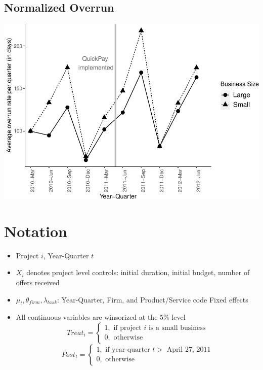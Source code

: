 \documentclass[
]{article}
\providecommand{\tightlist}{%
  \setlength{\itemsep}{0pt}\setlength{\parskip}{0pt}}
\begin{document}
\hypertarget{normalized-overrun}{%
\subsection{Normalized Overrun}\label{normalized-overrun}}

\includegraphics{qp_first_budget_overrun_files/figure-latex/normalized_plot-1.pdf}

\hypertarget{notation}{%
\section{Notation}\label{notation}}

\begin{itemize}
\tightlist
\item
  Project \(i\), Year-Quarter \(t\)
\item
  \(X_i\) denotes project level controls: initial duration, initial
  budget, number of offers received
\item
  \(\mu_t,\theta_{firm},\lambda_{task}\): Year-Quarter, Firm, and
  Product/Service code Fixed effects
\item
  All continuous variables are winsorized at the 5\% level
  \[ Treat_i = \begin{cases} 1, \text{ if project } i \text{ is a small business}\\
  0, \text{ otherwise} \end{cases}\]
  \[ Post_t = \begin{cases} 1, \text{ if year-quarter } t > \text{ April 27, 2011}\\
  0, \text{ otherwise} \end{cases}\]
\end{itemize}
\end{document}
